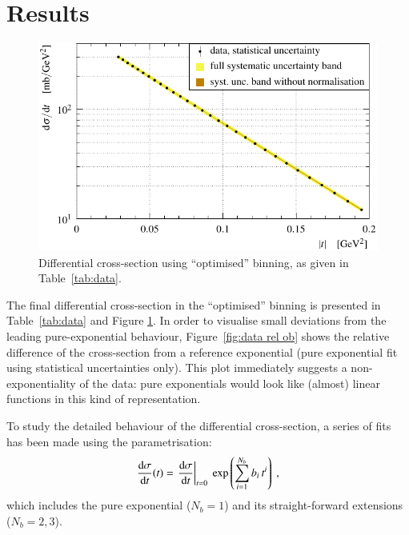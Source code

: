 \section{Results}
\label{sec:results}


\begin{figure}
\begin{center}
\includegraphics{fig/t_dist.pdf}
\caption{%
Differential cross-section using ``optimised'' binning, as given in Table~\ref{tab:data}.
}
\label{fig:data ob}
\end{center}
\end{figure}


The final differential cross-section in the ``optimised'' binning is presented in Table~\ref{tab:data} and Figure \ref{fig:data ob}. In order to visualise small deviations from the leading pure-exponential behaviour, Figure~\ref{fig:data rel ob} shows the relative difference of the cross-section from a reference exponential (pure exponential fit using statistical uncertainties only). This plot immediately suggests a non-exponentiality of the data: pure exponentials would look like (almost) linear functions in this kind of representation.

To study the detailed behaviour of the differential cross-section, a series of fits has been made using the parametrisation:
\begin{equation}
\label{eq:fit param}
{\d\sigma\over\d t}(t) = \left. \d\sigma\over\d t\right|_{t=0} \ \exp\left( \sum\limits_{i = 1}^{N_{b}} b_i\, t^i \right) \ ,
\end{equation}
which includes the pure exponential ($N_b = 1$) and its straight-forward extensions ($N_b = 2, 3$).

